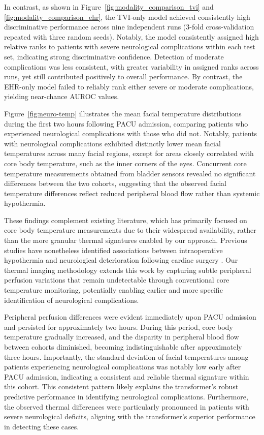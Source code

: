 In contrast, as shown in Figure~\ref{fig:modality_comparison_tvi} and \ref{fig:modality_comparison_ehr}, the TVI-only model achieved consistently high discriminative performance across nine independent runs (3-fold cross-validation repeated with three random seeds). Notably, the model consistently assigned high relative ranks to patients with severe neurological complications within each test set, indicating strong discriminative confidence. Detection of moderate complications was less consistent, with greater variability in assigned ranks across runs, yet still contributed positively to overall performance.
By contrast, the EHR-only model failed to reliably rank either severe or moderate complications, yielding near-chance AUROC values.

Figure~\ref{fig:neuro-temp} illustrates the mean facial temperature distributions during the first two hours following PACU admission, comparing patients who experienced neurological complications with those who did not. Notably, patients with neurological complications exhibited distinctly lower mean facial temperatures across many facial regions, except for areas closely correlated with core body temperature, such as the inner corners of the eyes. Concurrent core temperature measurements obtained from bladder sensors revealed no significant differences between the two cohorts, suggesting that the observed facial temperature differences reflect reduced peripheral blood flow rather than systemic hypothermia.

These findings complement existing literature, which has primarily focused on core body temperature measurements due to their widespread availability, rather than the more granular thermal signatures enabled by our approach. Previous studies have nonetheless identified associations between intraoperative hypothermia and neurological deterioration following cardiac surgery \citep{wang2024relationship, ju2023association, qu2025hypothermic}. Our thermal imaging methodology extends this work by capturing subtle peripheral perfusion variations that remain undetectable through conventional core temperature monitoring, potentially enabling earlier and more specific identification of neurological complications.

Peripheral perfusion differences were evident immediately upon PACU admission and persisted for approximately two hours. During this period, core body temperature gradually increased, and the disparity in peripheral blood flow between cohorts diminished, becoming indistinguishable after approximately three hours. Importantly, the standard deviation of facial temperatures among patients experiencing neurological complications was notably low early after PACU admission, indicating a consistent and reliable thermal signature within this cohort. This consistent pattern likely explains the transformer's robust predictive performance in identifying neurological complications. Furthermore, the observed thermal differences were particularly pronounced in patients with severe neurological deficits, aligning with the transformer's superior performance in detecting these cases.

